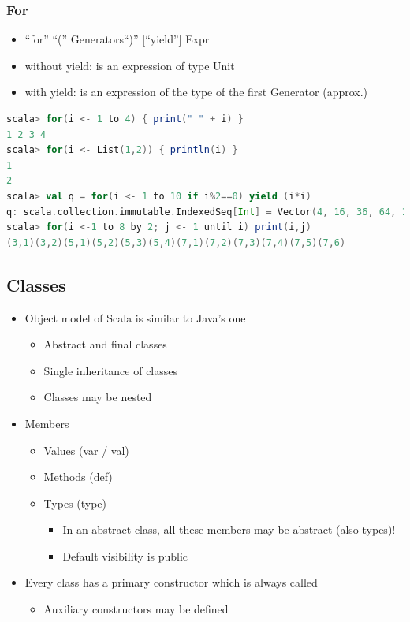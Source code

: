 \hypertarget{for}{%
\subsubsection{For}\label{for}}

\begin{itemize}
\tightlist
\item
  ``for'' ``('' Generators``)'' {[}``yield''{]} Expr
\item
  without yield: is an expression of type Unit
\item
  with yield: is an expression of the type of the first Generator
  (approx.)
\end{itemize}

\begin{lstlisting}[language=scala]
scala> for(i <- 1 to 4) { print(" " + i) }
1 2 3 4
scala> for(i <- List(1,2)) { println(i) }
1
2
scala> val q = for(i <- 1 to 10 if i%2==0) yield (i*i)
q: scala.collection.immutable.IndexedSeq[Int] = Vector(4, 16, 36, 64, 100)
scala> for(i <-1 to 8 by 2; j <- 1 until i) print(i,j)
(3,1)(3,2)(5,1)(5,2)(5,3)(5,4)(7,1)(7,2)(7,3)(7,4)(7,5)(7,6)
\end{lstlisting}

\hypertarget{classes}{%
\subsection{Classes}\label{classes}}

\begin{itemize}
\tightlist
\item
  Object model of Scala is similar to Java's one

  \begin{itemize}
  \tightlist
  \item
    Abstract and final classes
  \item
    Single inheritance of classes
  \item
    Classes may be nested
  \end{itemize}
\item
  Members

  \begin{itemize}
  \tightlist
  \item
    Values (var / val)
  \item
    Methods (def)
  \item
    Types (type)

    \begin{itemize}
    \tightlist
    \item
      In an abstract class, all these members may be abstract (also
      types)!
    \item
      Default visibility is public
    \end{itemize}
  \end{itemize}
\item
  Every class has a primary constructor which is always called

  \begin{itemize}
  \tightlist
  \item
    Auxiliary constructors may be defined
  \end{itemize}
\end{itemize}

